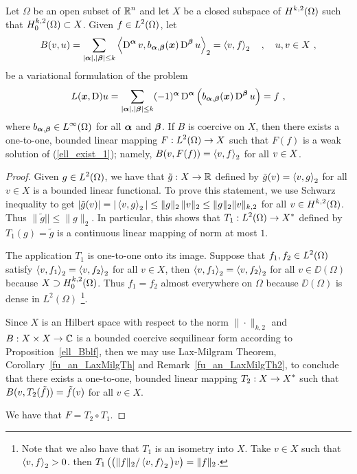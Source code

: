 \begin{theorem} \label{ell_exist_th1}
Let $\Omega$ be an open subset of $\displaystyle \mathbb{R}^n$ and let $X$ be a closed
subspace of $\displaystyle H^{k,2}(\Omega)$ such that
$\displaystyle H^{k,2}_0(\Omega) \subset X$.
Given $\displaystyle f \in L^2(\Omega)$, let
\begin{equation} \label{ell_exist_1}
B(v,u) = \sum_{|\VEC{\alpha}|,|\VEC{\beta}|\leq k}
\ps{\diff^{\VEC{\alpha}} v}{b_{\VEC{\alpha},\VEC{\beta}}(\VEC{x})
\diff^{\VEC{\beta}} u}_2 = \ps{v}{f}_2 \quad , \quad u,v \in X \ ,
\end{equation}
be a variational formulation of the problem
\begin{equation} \label{ell_exist_2}
L({\bm{x}},\operatorname{D})u = \sum_{|{\bm{\alpha}}|,|{\bm{\beta}}|\leq k}
(-1)^{{\bm{\alpha}}} \operatorname{D}^{{\bm{\alpha}}}
\left( b_{{\bm{\alpha}},{\bm{\beta}}}({\bm{x}}) \operatorname{D}^{{\bm{\beta}}} u\right) = f \  ,
\end{equation}
where $\displaystyle b_{{\bm{\alpha}},{\bm{\beta}}} \in L^\infty(\Omega)$ for all
${\bm{\alpha}}$ and ${\bm{\beta}}$.
If $B$ is coercive on $X$, then there exists a one-to-one, bounded
linear mapping $\displaystyle F:L^2(\Omega) \rightarrow X$ such that
$F(f)$ is a weak solution of (\ref{ell_exist_1}); namely,
$\displaystyle B(v,F(f)) = \left\langle{v} , {f}\right\rangle_2$ for all $\displaystyle v \in X$.
\end{theorem}

\begin{proof}
Given $\displaystyle g \in L^2(\Omega)$, we have that
$\tilde{g}:X \to \mathbb{R}$ defined by
$\tilde{g}(v) = \left\langle{v} , {g}\right\rangle_2$ for all $v \in X$ is a bounded linear
functional.  To prove this statement, we use Schwarz inequality to get
$\displaystyle |\tilde{g}(v)| =|\left\langle{v} , {g}\right\rangle_2|
\leq \|g\|_2 \, \|v\|_2 \leq \|g\|_2 \|v\|_{k,2}$
for all $\displaystyle v \in H^{k,2}(\Omega)$.  Thus 
$\|\tilde{g}|| \leq \|g\|_2$.  In particular, this shows that
$\displaystyle T_1:L^2(\Omega) \to X^\ast$ defined by
$T_1(g) = \tilde{g}$ is a continuous linear mapping of norm at most $1$. 

The application $T_1$ is one-to-one onto its image.  Suppose that
$\displaystyle f_1, f_2 \in L^2(\Omega)$ satisfy
$\left\langle{v} , {f_1}\right\rangle_2 = \left\langle{v} , {f_2}\right\rangle_2$ for all $v\in X$, then 
$\left\langle{v} , {f_1}\right\rangle_2 = \left\langle{v} , {f_2}\right\rangle_2$ for all $v\in \DD(\Omega)$ because
$\displaystyle X\supset H^{k,2}_0(\Omega)$.  Thus $f_1=f_2$ almost
everywhere on $\Omega$ because $\DD(\Omega)$ is dense in
$L^2(\Omega)$ \footnote{Note that we also have that $T_1$ is an
isometry into $X$.  Take $v \in X$ such that $\left\langle{v} , {f}\right\rangle_2>0$. then
$\displaystyle T_1\left(\big(\|f\|_2 / \left\langle{v} , {f}\right\rangle_2\big) v\right) = \|f\|_2$.}.

Since $X$ is an Hilbert space with respect to the norm
$\|\cdot\|_{k,2}$ and $B:X\times X \rightarrow \mathbb{C}$ is a bounded
coercive sequilinear form according to Proposition~\ref{ell_Bblf}, then we may
use Lax-Milgram Theorem, Corollary~\ref{fu_an_LaxMilgTh}
and Remark~\ref{fu_an_LaxMilgTh2}, to conclude that there exists a
one-to-one, bounded linear mapping
$\displaystyle T_2:X \rightarrow X^\ast$ such that
$\displaystyle B(v,T_2(\tilde{f})) = \tilde{f}(v)$ for all $v \in X$.

We have that $F = T_2 \circ T_1$.
\end{proof}


